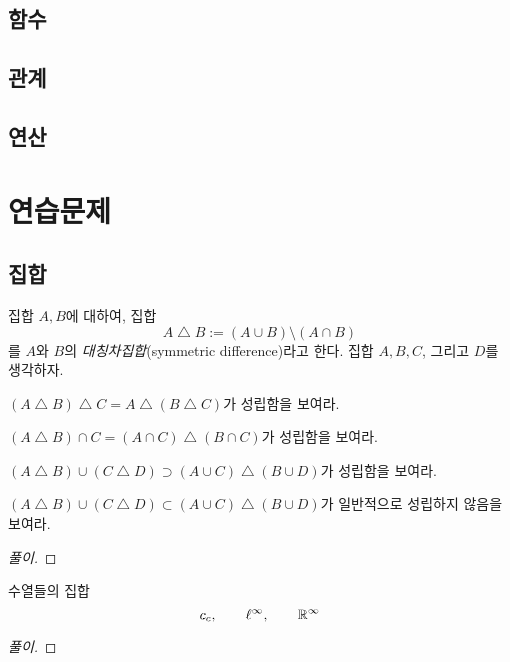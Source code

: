 \documentclass{../../large}
\begin{document}
\subsection*{함수}

\subsection*{관계}
\subsection*{연산}



\onecolumn
\section*{연습문제}
\setcounter{problem}{0}

\subsection*{집합}
\begin{problem}[대칭차집합]
집합 $A,B$에 대하여, 집합
\[A\mathrel{\triangle}B:=(A\cup B)\setminus(A\cap B)\]
를 $A$와 $B$의 \emph{대칭차집합}(symmetric difference)라고 한다.
집합 $A,B,C$, 그리고 $D$를 생각하자.
\begin{parts}
\item $(A\mathrel{\triangle}B)\mathrel{\triangle}C=A\mathrel{\triangle}(B\mathrel{\triangle}C)$가 성립함을 보여라.
\item $(A\mathrel{\triangle}B)\cap C=(A\cap C)\mathrel{\triangle}(B\cap C)$가 성립함을 보여라.
\item $(A\mathrel{\triangle}B)\cup(C\mathrel{\triangle}D)\supset(A\cup C)\mathrel{\triangle}(B\cup D)$가 성립함을 보여라.
\item $(A\mathrel{\triangle}B)\cup(C\mathrel{\triangle}D)\subset(A\cup C)\mathrel{\triangle}(B\cup D)$가 일반적으로 성립하지 않음을 보여라.
\end{parts}
\end{problem}
\begin{proof}[풀이]
\end{proof}

\begin{problem}[무한 곱집합]
수열들의 집합
\[c_c,\qquad\ell^\infty,\qquad\mathbb{R}^\infty\]
\end{problem}
\begin{proof}[풀이]
\end{proof}
\end{document}

